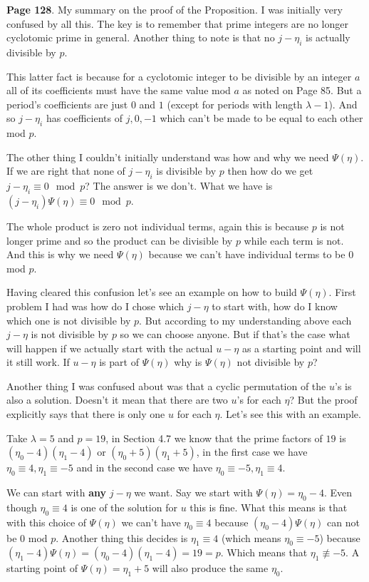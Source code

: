 \documentclass[aps,preprint,preprintnumbers,nofootinbib,showpacs,prd]{revtex4-1}
\begin{document}
{\bf Page 128}. My summary on the proof of the Proposition. I was initially very confused by all this. The key is to remember that prime integers are no longer cyclotomic prime in general. Another thing to note is that no $j - \eta_i$ is actually divisible by $p$.

This latter fact is because for a cyclotomic integer to be divisible by an integer $a$ all of its coefficients must have the same value mod $a$ as noted on Page 85. But a period's coefficients are just $0$ and $1$ (except for periods with length $\lambda - 1$). And so $j - \eta_i$ has coefficients of $j ,0,-1$ which can't be made to be equal to each other mod $p$.

The other thing I couldn't initially understand was how and why we need $\Psi(\eta)$. If we are right that none of $j - \eta_i$ is divisible by $p$ then how do we get $j - \eta_i \equiv 0 \mod{p}$? The answer is we don't. What we have is $(j - \eta_i)\Psi(\eta) \equiv 0 \mod{p}$. 

The whole product is zero not individual terms, again this is because $p$ is not longer prime and so the product can be divisible by $p$ while each term is not. And this is why we need $\Psi(\eta)$ because we can't have individual terms to be 0 mod $p$.

Having cleared this confusion let's see an example on how to build $\Psi(\eta)$. First problem I had was how do I chose which $j - \eta$ to start with, how do I know which one is not divisible by $p$. But according to my understanding above each $j - \eta$ is not divisible by $p$ so we can choose anyone. But if that's the case what will happen if we actually start with the actual $u - \eta$ as a starting point and will it still work. If $u - \eta$ is part of $\Psi(\eta)$ why is $\Psi(\eta)$ not divisible by $p$? 

Another thing I was confused about was that a cyclic permutation of the $u$'s is also a solution. Doesn't it mean that there are two $u$'s for each $\eta$? But the proof explicitly says that there is only one $u$ for each $\eta$. Let's see this with an example.

Take $\lambda = 5$ and $p = 19$, in Section 4.7 we know that the prime factors of $19$ is $(\eta_0 - 4)(\eta_1 - 4)$ or $(\eta_0 + 5)(\eta_1 + 5)$, in the first case we have $\eta_0 \equiv 4, \eta_1 \equiv -5$ and in the second case we have $\eta_0 \equiv -5, \eta_1 \equiv 4$.

We can start with {\bf any} $j - \eta$ we want. Say we start with $\Psi(\eta) = \eta_0 - 4$. Even though $\eta_0 \equiv 4$ is one of the solution for $u$ this is fine. What this means is that with this choice of $\Psi(\eta)$ we can't have $\eta_0 \equiv 4$ because $(\eta_0 - 4)\Psi(\eta)$ can not be 0 mod $p$. Another thing this decides is $\eta_1 \equiv 4$ (which means $\eta_0 \equiv -5$) because $(\eta_1 - 4)\Psi(\eta) = (\eta_0 - 4)(\eta_1 - 4) = 19 = p$. Which means that $\eta_1 \not\equiv -5$. A starting point of $\Psi(\eta) = \eta_1 + 5$ will also produce the same $\eta_0$.
\end{document}
